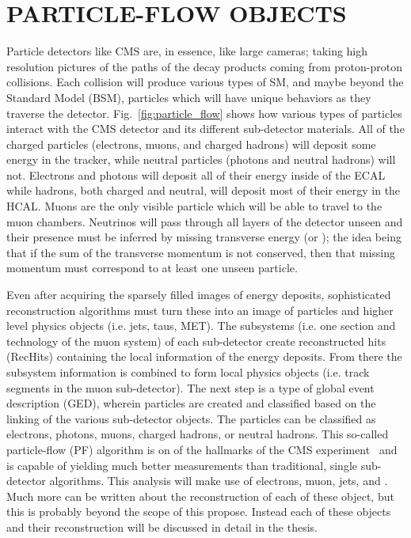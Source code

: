 %
%
%



\chapter{\uppercase {Particle-Flow Objects}}

Particle detectors like CMS are, in essence, like large cameras; taking high resolution pictures of the paths of the decay products coming from proton-proton collisions.
Each collision will produce various types of SM, and maybe beyond the Standard Model (BSM), particles which will have unique behaviors as they traverse the detector.
Fig.~\ref{fig:particle_flow} shows how various types of particles interact with the CMS detector and its different sub-detector materials.
All of the charged particles (\ie electrons, muons, and charged hadrons) will deposit some energy in the tracker, while neutral particles (\ie photons and neutral hadrons) will not.
Electrons and photons will deposit all of their energy inside of the ECAL while hadrons, both charged and neutral, will deposit most of their energy in the HCAL.
Muons are the only visible particle which will be able to travel to the muon chambers.
Neutrinos will pass through all layers of the detector unseen and their presence must be inferred by missing transverse energy (\MET or \ETslash); the idea being that if the sum of the transverse momentum is not conserved, then that missing momentum must correspond to at least one unseen particle.

Even after acquiring the sparsely filled images of energy deposits, sophisticated reconstruction algorithms must turn these into an image of particles and higher level physics objects (i.e. jets, taus, MET).
The subsystems (i.e. one section and technology of the muon system) of each sub-detector create reconstructed hits (RecHits) containing the local information of the energy deposits.
From there the subsystem information is combined to form local physics objects (i.e. track segments in the muon sub-detector).
The next step is a type of global event description (GED), wherein particles are created and classified based on the linking of the various sub-detector objects.
The particles can be classified as electrons, photons, muons, charged hadrons, or neutral hadrons.
This so-called particle-flow (PF) algorithm is on of the hallmarks of the CMS experiment~\cite{CMS-PRF-14-001} and is capable of yielding much better measurements than traditional, single sub-detector algorithms.
This analysis will make use of electrons, muon, jets, and \ETslash.
Much more can be written about the reconstruction of each of these object, but this is probably beyond the scope of this propose.
Instead each of these objects and their reconstruction will be discussed in detail in the thesis.

